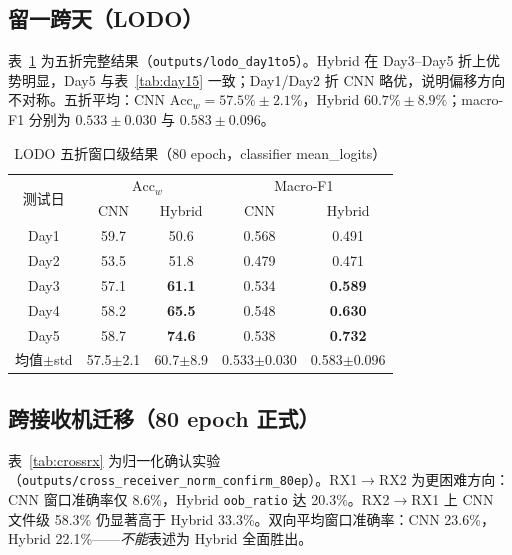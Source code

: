 \documentclass[journal]{IEEEtran}
\begin{document}
\subsection{留一跨天（LODO）}
表~\ref{tab:lodo} 为五折完整结果（\texttt{outputs/lodo\_day1to5}）。Hybrid 在 Day3--Day5 折上优势明显，Day5 与表~\ref{tab:day15} 一致；Day1/Day2 折 CNN 略优，说明偏移方向不对称。五折平均：CNN $\mathrm{Acc}_w=57.5\%\pm2.1\%$，Hybrid $60.7\%\pm8.9\%$；macro-F1 分别为 $0.533\pm0.030$ 与 $0.583\pm0.096$。

\begin{table}[!t]
\caption{LODO 五折窗口级结果（80 epoch，classifier mean\_logits）}
\label{tab:lodo}
\centering
\renewcommand{\arraystretch}{1.1}
\begin{tabular}{c|cc|cc}
\toprule
\multirow{2}{*}{测试日} & \multicolumn{2}{c|}{$\mathrm{Acc}_w$} & \multicolumn{2}{c}{Macro-F1} \\
 & CNN & Hybrid & CNN & Hybrid \\
\midrule
Day1 & 59.7 & 50.6 & 0.568 & 0.491 \\
Day2 & 53.5 & 51.8 & 0.479 & 0.471 \\
Day3 & 57.1 & \textbf{61.1} & 0.534 & \textbf{0.589} \\
Day4 & 58.2 & \textbf{65.5} & 0.548 & \textbf{0.630} \\
Day5 & 58.7 & \textbf{74.6} & 0.538 & \textbf{0.732} \\
\midrule
均值$\pm$std & 57.5$\pm$2.1 & 60.7$\pm$8.9 & 0.533$\pm$0.030 & 0.583$\pm$0.096 \\
\bottomrule
\end{tabular}
\end{table}

\subsection{跨接收机迁移（80 epoch 正式）}
表~\ref{tab:crossrx} 为归一化确认实验（\texttt{outputs/cross\_receiver\_norm\_confirm\_80ep}）。RX1$\rightarrow$RX2 为更困难方向：CNN 窗口准确率仅 8.6\%，Hybrid \texttt{oob\_ratio} 达 20.3\%。RX2$\rightarrow$RX1 上 CNN 文件级 58.3\% 仍显著高于 Hybrid 33.3\%。双向平均窗口准确率：CNN 23.6\%，Hybrid 22.1\%——\emph{不能}表述为 Hybrid 全面胜出。
\end{document}
